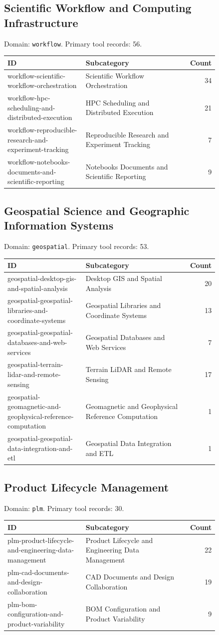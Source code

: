 \subsection{Scientific Workflow and Computing Infrastructure}
\noindent Domain: \texttt{workflow}. Primary tool records: 56.
\begin{longtable}{p{0.37\linewidth}p{0.47\linewidth}r}
ID & Subcategory & Count\\\hline\endhead
workflow-scientific-workflow-orchestration & Scientific Workflow Orchestration & 34\\
workflow-hpc-scheduling-and-distributed-execution & HPC Scheduling and Distributed Execution & 21\\
workflow-reproducible-research-and-experiment-tracking & Reproducible Research and Experiment Tracking & 7\\
workflow-notebooks-documents-and-scientific-reporting & Notebooks Documents and Scientific Reporting & 9\\
\end{longtable}
\subsection{Geospatial Science and Geographic Information Systems}
\noindent Domain: \texttt{geospatial}. Primary tool records: 53.
\begin{longtable}{p{0.37\linewidth}p{0.47\linewidth}r}
ID & Subcategory & Count\\\hline\endhead
geospatial-desktop-gis-and-spatial-analysis & Desktop GIS and Spatial Analysis & 20\\
geospatial-geospatial-libraries-and-coordinate-systems & Geospatial Libraries and Coordinate Systems & 13\\
geospatial-geospatial-databases-and-web-services & Geospatial Databases and Web Services & 7\\
geospatial-terrain-lidar-and-remote-sensing & Terrain LiDAR and Remote Sensing & 17\\
geospatial-geomagnetic-and-geophysical-reference-computation & Geomagnetic and Geophysical Reference Computation & 1\\
geospatial-geospatial-data-integration-and-etl & Geospatial Data Integration and ETL & 1\\
\end{longtable}
\subsection{Product Lifecycle Management}
\noindent Domain: \texttt{plm}. Primary tool records: 30.
\begin{longtable}{p{0.37\linewidth}p{0.47\linewidth}r}
ID & Subcategory & Count\\\hline\endhead
plm-product-lifecycle-and-engineering-data-management & Product Lifecycle and Engineering Data Management & 22\\
plm-cad-documents-and-design-collaboration & CAD Documents and Design Collaboration & 19\\
plm-bom-configuration-and-product-variability & BOM Configuration and Product Variability & 9\\
\end{longtable}
